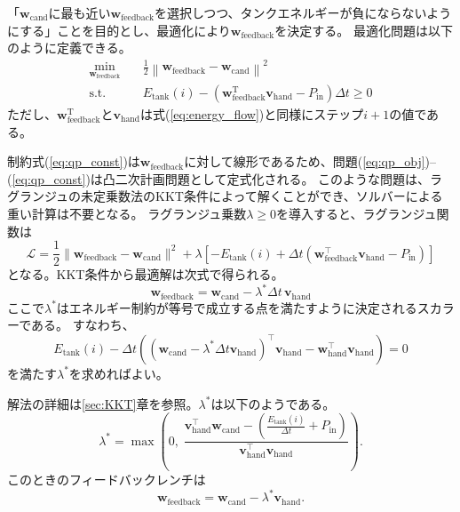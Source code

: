 \documentclass[uplatex]{jsarticle}
\begin{document}
「$\bm{w}_{\text{cand}}$に最も近い$\bm{w}_{\text{feedback}}$を選択しつつ、タンクエネルギーが負にならないようにする」ことを目的とし、最適化により$\bm{w}_{\text{feedback}}$を決定する。
最適化問題は以下のように定義できる。
\begin{align}
  \min_{\bm{w}_{\text{feedback}}} \quad & \frac{1}{2} \left\| \bm{w}_{\text{feedback}} - \bm{w}_{\text{cand}} \right\|^2 \label{eq:qp_obj}\\
  \mathrm{s.t.} \quad &
  E_{\text{tank}}(i) - \left( \bm{w}_{\text{feedback}}^{\text{T}} \bm{v}_{\text{hand}} - P_{\text{in}} \right) \Delta t \ge 0 \label{eq:qp_const}
\end{align}
ただし、$\bm{w}_{\text{feedback}}^{\text{T}}$と$\bm{v}_{\text{hand}}$は式(\ref{eq:energy_flow})と同様にステップ$i+1$の値である。

制約式(\ref{eq:qp_const})は$\bm{w}_{\text{feedback}}$に対して線形であるため、問題(\ref{eq:qp_obj})--(\ref{eq:qp_const})は凸二次計画問題として定式化される。
このような問題は、ラグランジュの未定乗数法のKKT条件によって解くことができ、ソルバーによる重い計算は不要となる。
ラグランジュ乗数$\lambda \ge 0$を導入すると、ラグランジュ関数は
\begin{equation}
  \mathcal{L} = \frac{1}{2}\|\bm{w}_{\text{feedback}} - \bm{w}_{\text{cand}}\|^2 
  + \lambda \left[ -E_{\text{tank}}(i) + \Delta t \left( \bm{w}_{\text{feedback}}^{\top} \bm{v}_{\text{hand}} - P_{\text{in}} \right) \right]
\end{equation}
となる。KKT条件から最適解は次式で得られる。
\begin{equation}
  \bm{w}_{\text{feedback}} = \bm{w}_{\text{cand}} - \lambda^\ast \Delta t \, \bm{v}_{\text{hand}}
\end{equation}
ここで$\lambda^\ast$はエネルギー制約が等号で成立する点を満たすように決定されるスカラーである。  
すなわち、
\begin{equation}
  E_{\text{tank}}(i) - \Delta t \left( (\bm{w}_{\text{cand}} - \lambda^\ast \Delta t \bm{v}_{\text{hand}})^{\top} \bm{v}_{\text{hand}} - \bm{w}_{\text{hand}}^{\top} \bm{v}_{\text{hand}} \right) = 0
\end{equation}
を満たす$\lambda^\ast$を求めればよい。

解法の詳細は\ref{sec:KKT}章を参照。$\lambda^\ast$は以下のようである。
\begin{equation}
  \lambda^\ast = \max\!\left(0,\; \frac{\bm{v}_{\text{hand}}^\top \bm{w}_{\text{cand}} - (\frac{E_{\text{tank}}(i)}{\Delta t} + P_{\text{in}})}{\bm{v}_{\text{hand}}^\top \bm{v}_{\text{hand}}} \right).
\end{equation}
このときのフィードバックレンチは
\begin{equation}
  \bm{w}_{\text{feedback}} = \bm{w}_{\text{cand}} - \lambda^\ast \bm{v}_{\text{hand}}.
\end{equation}
\end{document}
